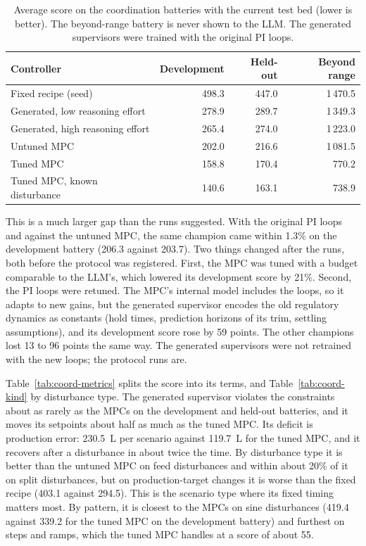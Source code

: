 \begin{table}[tb]
  \centering
  \caption{Average score on the coordination batteries with the current test
    bed (lower is better). The beyond-range battery is never shown to the
    LLM. The generated supervisors were trained with the original PI loops.}
  \label{tab:coord-main}
  \begin{tabular}{@{}lrrr@{}}
    \toprule
    Controller & Development & Held-out & Beyond range \\
    \midrule
    Fixed recipe (seed)                 & 498.3 & 447.0 & 1\,470.5 \\
    Generated, low reasoning effort     & 278.9 & 289.7 & 1\,349.3 \\
    Generated, high reasoning effort    & 265.4 & 274.0 & 1\,223.0 \\
    Untuned MPC                         & 202.0 & 216.6 & 1\,081.5 \\
    Tuned MPC                           & 158.8 & 170.4 &    770.2 \\
    Tuned MPC, known disturbance        & 140.6 & 163.1 &    738.9 \\
    \bottomrule
  \end{tabular}
\end{table}

This is a much larger gap than the runs suggested. With the original PI loops
and against the untuned MPC, the same champion came within 1.3\% on the
development battery (206.3 against 203.7). Two things changed after the runs,
both before the protocol was registered. First, the MPC was tuned with a
budget comparable to the LLM's, which lowered its development score by
21\%. Second, the PI loops were retuned. The MPC's internal model includes
the loops, so it adapts to new gains, but the generated supervisor encodes
the old regulatory dynamics as constants (hold times, prediction horizons of
its trim, settling assumptions), and its development score rose by 59
points. The other champions lost 13 to 96 points the same way. The
generated supervisors were not retrained with the new loops; the protocol
runs are.

Table~\ref{tab:coord-metrics} splits the score into its terms, and
Table~\ref{tab:coord-kind} by disturbance type. The generated supervisor
violates the constraints about as rarely as the MPCs on the development and
held-out batteries, and it moves its setpoints about half as much as the
tuned MPC. Its deficit is production error: 230.5~L per scenario against
119.7~L for the tuned MPC, and it recovers after a disturbance in about twice
the time. By disturbance type it is better than the untuned MPC on feed
disturbances and within about 20\% of it on split disturbances, but on production-target
changes it is worse than the fixed recipe (403.1 against 294.5). This is the
scenario type where its fixed timing matters most. By pattern, it is
closest to the MPCs on sine disturbances (419.4 against 339.2 for the tuned
MPC on the development battery) and furthest on steps and ramps, which the
tuned MPC handles at a score of about 55.

